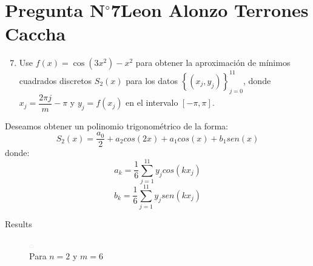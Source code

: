 \section{Pregunta N$^{\circ}$7\qquad Leon Alonzo Terrones Caccha}

\begin{frame}
    \begin{enumerate}\setcounter{enumi}{6}
        \item

              Use
              \begin{math}
                  f\left(x\right)=
                  \cos\left(3x^{2}\right)-
                  x^{2}
              \end{math}
              para obtener la aproximación de mínimos cuadrados
              discretos $S_{2}\left(x\right)$ para los datos
              \begin{math}
                  \left\{
                  \left(x_{j},y_{j}\right)
                  \right\}_{j=0}^{11}
              \end{math},
              donde $x_{j}=\dfrac{2\pi j}{m}-\pi$ y
              $y_{j}=f\left(x_{j}\right)$ en el intervalo
              $\left[-\pi,\pi\right]$.
    \end{enumerate}

    \begin{solution}
        Deseamos obtener un polinomio trigonométrico de la forma:
        \[S_{2}\left(x\right)=\frac{a_{0}}{2}+a_{2}cos(2x)+a_1cos(x)+b_1sen(x)\]
        donde:
        \[a_k=\frac{1}{6}\sum_{j=1}^{11}{y_jcos(kx_j)}\]
        \[b_k=\frac{1}{6}\sum_{j=1}^{11}{y_jsen(kx_j)}\]
    \end{solution}
\end{frame}
\begin{frame}{Results}
    \begin{figure}
        \centering
        \includegraphics[width=8]{p7-Aprox-discreta.png}
        \caption{Para $n=2$ y $m=6$}
        \label{fig:enter-label}
    \end{figure}
\end{frame}
